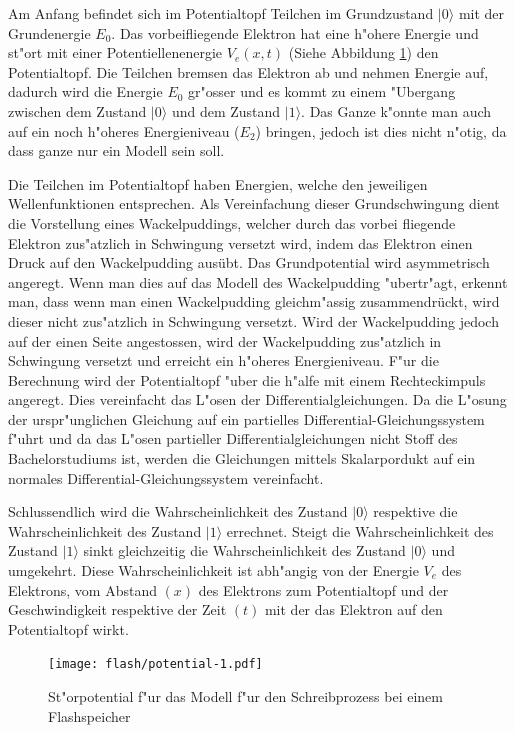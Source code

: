 \begin{refsection}
Am Anfang befindet sich im Potentialtopf Teilchen im Grundzustand $|0\rangle$
mit der Grundenergie $E_{0}$.
Das vorbeifliegende Elektron hat eine h"ohere Energie und st"ort mit
einer Potentiellenenergie $V_{e}(x,t)$ (Siehe Abbildung \ref{flash:Anregung})
den Potentialtopf.
Die Teilchen bremsen das Elektron ab und nehmen Energie auf, dadurch
wird die Energie $E_{0}$ gr"osser und es kommt zu einem "Ubergang 
zwischen dem Zustand $|0\rangle$ und dem Zustand $|1\rangle$.
Das Ganze k"onnte man auch auf ein noch h"oheres Energieniveau ($E_{2}$)
bringen, jedoch ist dies nicht n"otig, da dass ganze nur ein Modell
sein soll.

Die Teilchen im Potentialtopf haben Energien, welche den jeweiligen 
Wellenfunktionen entsprechen.
Als Vereinfachung dieser Grundschwingung dient die Vorstellung eines
Wackelpuddings, welcher durch das vorbei fliegende Elektron zus"atzlich
in Schwingung versetzt wird, indem das Elektron einen Druck auf den
Wackelpudding ausübt.
Das Grundpotential wird asymmetrisch angeregt.
Wenn man dies auf das Modell des Wackelpudding "ubertr"agt, erkennt man,
dass wenn man einen Wackelpudding gleichm"assig zusammendrückt, wird
dieser nicht zus"atzlich in Schwingung versetzt.
Wird der Wackelpudding jedoch auf der einen Seite angestossen, wird der
Wackelpudding zus"atzlich in Schwingung versetzt und erreicht ein
h"oheres Energieniveau.
F"ur die Berechnung wird der Potentialtopf "uber die h"alfe mit einem
Rechteckimpuls angeregt.
Dies vereinfacht das L"osen der Differentialgleichungen.
Da die L"osung der urspr"unglichen Gleichung auf ein partielles
Differential-Gleichungssystem f"uhrt und da das L"osen partieller
Differentialgleichungen nicht Stoff des Bachelorstudiums ist, werden
die Gleichungen mittels Skalarpordukt auf ein normales
Differential-Gleichungssystem vereinfacht.

Schlussendlich wird die Wahrscheinlichkeit des Zustand $|0\rangle$ 
respektive die Wahrscheinlichkeit des Zustand $|1\rangle$ errechnet.
Steigt die Wahrscheinlichkeit des Zustand $|1\rangle$ sinkt gleichzeitig
die Wahrscheinlichkeit des Zustand $|0\rangle$ und umgekehrt.
Diese Wahrscheinlichkeit ist abh"angig von der Energie $V_{e}$ 
des Elektrons, vom Abstand $(x)$ des Elektrons zum Potentialtopf und der 
Geschwindigkeit respektive der Zeit $(t)$ mit der das Elektron auf den 
Potentialtopf wirkt.

\begin{figure}
\centering
\texttt{[image: flash/potential-1.pdf]}
\caption{St"orpotential f"ur das Modell f"ur den Schreibprozess bei
einem Flashspeicher
\label{flash:Anregung}}
\end{figure}


\end{refsection}
